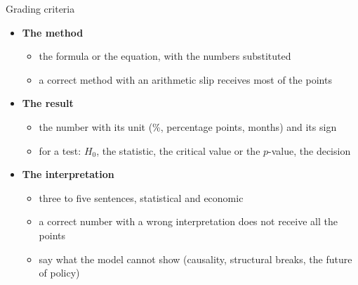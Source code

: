 \begin{frame}{Grading criteria}
\itemsize{\small}
\begin{itemize}
    \item \textbf{The method}
    \begin{itemize}
        \item the formula or the equation, with the numbers substituted
        \item a correct method with an arithmetic slip receives most of the points
    \end{itemize}
    \item \textbf{The result}
    \begin{itemize}
        \item the number with its unit (\%, percentage points, months) and its sign
        \item for a test: $H_0$, the statistic, the critical value or the $p$-value, the decision
    \end{itemize}
    \item \textbf{The interpretation}
    \begin{itemize}
        \item three to five sentences, statistical and economic
        \item a correct number with a wrong interpretation does not receive all the points
        \item say what the model cannot show (causality, structural breaks, the future of policy)
    \end{itemize}
\end{itemize}
\end{frame}

